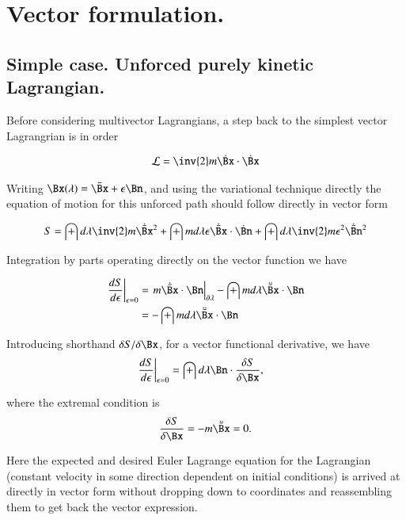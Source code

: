 \documentclass{article}
\newcommand{\LL}[0]{\mathcal{L}}
\begin{document}
\section{ Vector formulation. }

\subsection{ Simple case.  Unforced purely kinetic Lagrangian. }

Before considering multivector Lagrangians, a step back to the simplest vector Lagrangrian is in order

\begin{align*}
\LL = \inv{2}m \dot{\Bx} \cdot \dot{\Bx}
\end{align*}

Writing $\Bx(\lambda) = \bar{\Bx} + \epsilon \Bn$, and using the variational technique directly the equation of motion for this unforced path should follow directly
in vector form

\begin{align*}
S = \int d\lambda \inv{2} m \dot{\bar{\Bx}}^2 + \int m d\lambda \epsilon \dot{\bar{\Bx}} \cdot \dot{\Bn} + \int d\lambda \inv{2} m \epsilon^2 \dot{\bar{\Bn}}^2
\end{align*}

Integration by parts operating directly on the vector function we have

\begin{align*}
\left.\frac{d S}{d\epsilon}\right\vert_{\epsilon=0} 
&= \left.{m \dot{\bar{\Bx}} \cdot {\Bn}}\right\vert_{\partial \lambda} - \int m d\lambda \ddot{\bar{\Bx}} \cdot {\Bn} \\
&= - \int m d\lambda \ddot{\bar{\Bx}} \cdot {\Bn} \\
\end{align*}

Introducing shorthand $\delta S/\delta \Bx$, for a vector functional derivative, we have
\begin{align*}
\left.\frac{d S}{d\epsilon}\right\vert_{\epsilon=0} &= \int d\lambda \Bn \cdot \frac{\delta S}{\delta \Bx},
\end{align*}

where the extremal condition is
\begin{align*}
\frac{\delta S}{\delta \Bx} = - m \ddot{\bar{\Bx}} = 0.
\end{align*}

Here the expected and desired Euler Lagrange equation for the Lagrangian (constant velocity in some direction dependent on initial conditions) is arrived at directly in vector form without dropping down to coordinates and reassembling them to get back the vector expression.
\end{document}

